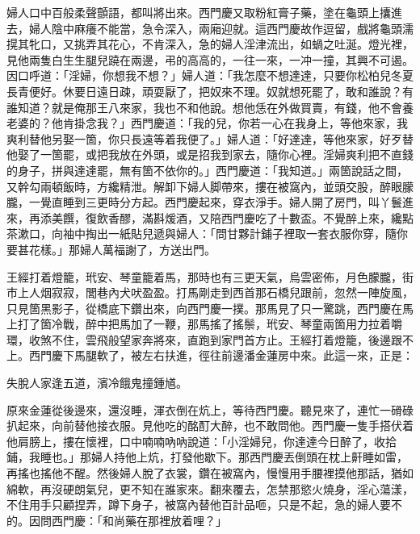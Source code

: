 婦人口中百般柔聲顫語，都叫將出來。{}西門慶又取粉紅膏子藥，塗在龜頭上攮進去，婦人陰中麻癢不能當，急令深入，兩廂迎就。這西門慶故作逗留，戲將龜頭濡㨪其牝口，又挑弄其花心，不肯深入，急的婦人淫津流出，如蝸之吐涎。燈光裡，見他兩隻白生生腿兒蹺在兩邊，弔的高高的，一往一來，一冲一撞，其興不可遏。因口呼道：「淫婦，你想我不想？」婦人道：「我怎麼不想達達，只要你松柏兒冬夏長青便好。休要日遠日疎，頑耍厭了，把奴來不理。奴就想死罷了，敢和誰說？有誰知道？就是俺那王八來家，我也不和他說。想他恁在外做買賣，有錢，他不會養老婆的？他肯掛念我？」西門慶道：「我的兒，你若一心在我身上，等他來家，我爽利替他另娶一箇，你只長遠等着我便了。」婦人道：「好達達，等他來家，好歹替他娶了一箇罷，或把我放在外頭，或是招我到家去，隨你心裡。淫婦爽利把不直錢的身子，拼與達達罷，無有箇不依你的。」{}西門慶道：「我知道。」兩箇說話之間，又幹勾兩頓飯時，方纔精泄。解卸下婦人脚帶來，摟在被窩內，並頭交股，醉眼朦朧，一覺直睡到三更時分方起。西門慶起來，穿衣淨手。婦人開了房門，叫丫鬟進來，再添美饌，復飲香醪，滿斟煖酒，又陪西門慶吃了十數盃。不覺醉上來，纔點茶漱口，向袖中掏出一紙貼兒遞與婦人：「問甘夥計鋪子裡取一套衣服你穿，隨你要甚花樣。」那婦人萬福謝了，方送出門。

王經打着燈籠，玳安、琴童籠着馬，那時也有三更天氣，烏雲密佈，月色朦朧，街市上人烟寂寂，閭巷內犬吠盈盈。打馬剛走到西首那石橋兒跟前，忽然一陣旋風，只見箇黑影子，從橋底下鑽出來，向西門慶一撲。{}那馬見了只一驚跳，西門慶在馬上打了箇冷戰，醉中把馬加了一鞭，那馬搖了搖鬃，玳安、琴童兩箇用力拉着嚼環，收煞不住，雲飛般望家奔將來，直跑到家門首方止。王經打着燈籠，後邊跟不上。西門慶下馬腿軟了，被左右扶進，徑往前邊潘金蓮房中來。{}此這一來，正是：

\begin{myquote} 
失脫人家逢五道，濱冷餓鬼撞鍾馗。
\end{myquote} 

原來金蓮從後邊來，還沒睡，渾衣倒在炕上，等待西門慶。聽見來了，連忙一磆碌扒起來，向前替他接衣服。見他吃的酩酊大醉，也不敢問他。西門慶一隻手搭伏着他肩膀上，摟在懷裡，口中喃喃吶吶說道：「小淫婦兒，你達達今日醉了，收拾鋪，我睡也。」那婦人持他上炕，打發他歇下。那西門慶丟倒頭在枕上鼾睡如雷，再搖也搖他不醒。然後婦人脫了衣裳，鑽在被窩內，慢慢用手腰裡摸他那話，猶如綿軟，再沒硬朗氣兒，更不知在誰家來。翻來覆去，怎禁那慾火燒身，淫心蕩漾，不住用手只顧捏弄，蹲下身子，被窩內替他百計品咂，只是不起，急的婦人要不的。因問西門慶：「和尚藥在那裡放着哩？」

